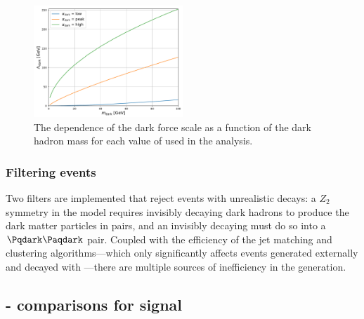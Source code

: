 \begin{figure}[htbp]
    \centering
    \includegraphics[width=0.5\textwidth]{figures/lambda_dark_vs_mDark.pdf}
    \caption[The dependence of the dark force scale \lamDark as a function of the dark hadron mass \mDark for each value of \aDark used in the analysis]{The dependence of the dark force scale \lamDark as a function of the dark hadron mass \mDark for each value of \aDark used in the analysis.}
    \label{fig:svj_lamDark_vs_mDark}
\end{figure}




\subsubsection{Filtering events}
\label{subsubsec:svj_pythia_filters}

Two filters are implemented that reject events with unrealistic decays: a $Z_2$ symmetry in the model requires invisibly decaying dark hadrons to produce the dark matter particles in pairs, and an invisibly decaying \PZprime must do so into a $\Pqdark\Paqdark$ pair. Coupled with the efficiency of the \gls{jet} matching and clustering algorithms---which only significantly affects events generated externally and decayed with \PYTHIA---there are multiple sources of inefficiency in the generation.




\subsection{\texorpdfstring{\PYTHIA}{Pythia}-\texorpdfstring{\MADGRAPH}{MadGraph} comparisons for \texorpdfstring{\schannel}{s-channel} signal}
\label{subsec:svj_schannel_comparisons}


